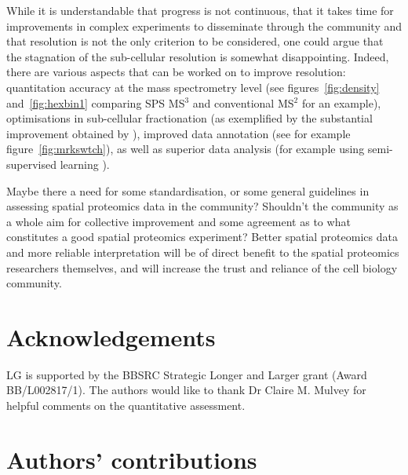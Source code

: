 \documentclass[12pt]{article}\usepackage[]{graphicx}\usepackage[]{color}
\begin{document}
While it is understandable that progress is not continuous, that it
takes time for improvements in complex experiments to disseminate
through the community and that resolution is not the only criterion to
be considered, one could argue that the stagnation of the sub-cellular
resolution is somewhat disappointing. Indeed, there are various
aspects that can be worked on to improve resolution: quantitation
accuracy at the mass spectrometry level (see
figures~\ref{fig:density} and~\ref{fig:hexbin1} comparing SPS MS$^3$
and conventional MS$^2$ for an example), optimisations in sub-cellular
fractionation (as exemplified by the substantial improvement obtained
by \citep{Christoforou:2016}), improved data annotation (see for
example figure~\ref{fig:mrkswtch}), as well as superior data analysis
(for example using semi-supervised learning \citet{Breckels:2013}).

Maybe there a need for some standardisation, or some general
guidelines in assessing spatial proteomics data in the community?
Shouldn't the community as a whole aim for collective improvement and
some agreement as to what constitutes a good spatial proteomics experiment?
Better spatial proteomics data and more reliable interpretation will
be of direct benefit to the spatial proteomics researchers themselves,
and will increase the trust and reliance of the cell biology
community.

\section*{Acknowledgements}

LG is supported by the BBSRC Strategic Longer and Larger grant (Award
BB/L002817/1).
The authors would like to thank Dr Claire M. Mulvey for helpful
comments on the quantitative assessment.

\section*{Authors' contributions}
\end{document}
